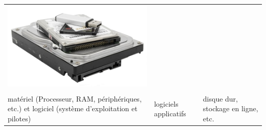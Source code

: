 \documentclass[xcolor=table]{beamer}
\begin{document}
\begin{frame}
\begin{center}
\begin{tabular}{p{}p{}p{}}
	\includegraphics[height=.25\textheight]{..//img/Bweb01-environnement/stockage.jpg}\\
	
	&&\\
	
	matériel (Processeur, RAM, périphériques, etc.) et logiciel (système d'exploitation et pilotes) &
	logiciels applicatifs & 
	disque dur, stockage en ligne, etc. \\
	\end{tabular}
\end{center}

\end{frame}

%
%
\end{document}
